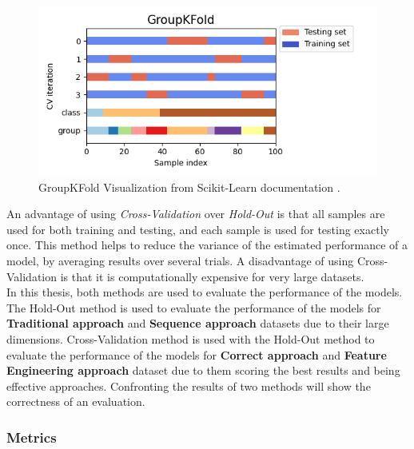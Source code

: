 \begin{itemize}
                    \begin{figure}[H]
                        \centering
                        \includegraphics[width=1.0\textwidth]{../src/resources/images/other/groupkfold.png}
                        \caption{
                          GroupKFold Visualization from Scikit-Learn documentation \cite{scikit-learn}.
                        }
                        \label{fig:groupkfold}
                    \end{figure}
                \end{itemize}
                
        An advantage of using \textit{Cross-Validation} over \textit{Hold-Out} is that all samples are used for both training and testing, and each sample is used for testing exactly once. This method helps to reduce the variance of the estimated performance of a model, by averaging results over several trials. A disadvantage of using Cross-Validation is that it is computationally expensive for very large datasets. \\ 

        In this thesis, both methods are used to evaluate the performance of the models. The Hold-Out method is used to evaluate the performance of the models for \textbf{Traditional approach} and \textbf{Sequence approach} datasets due to their large dimensions. Cross-Validation method is used with the Hold-Out method to evaluate the performance of the models for \textbf{Correct approach} and \textbf{Feature Engineering approach} dataset due to them scoring the best results and being effective approaches. Confronting the results of two methods will show the correctness of an evaluation. 
        
        \subsubsection{Metrics}

